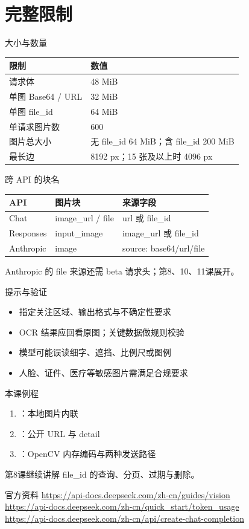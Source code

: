 \documentclass[aspectratio=169,UTF8]{ctexbeamer}
\begin{document}
\section{完整限制}
\begin{frame}{大小与数量}
\small
\begin{tabular}{ll}
\toprule
限制 & 数值\\
\midrule
请求体 & 48 MiB\\
单图 Base64 / URL & 32 MiB\\
单图 file\_id & 64 MiB\\
单请求图片数 & 600\\
图片总大小 & 无 file\_id 64 MiB；含 file\_id 200 MiB\\
最长边 & 8192 px；15 张及以上时 4096 px\\
\bottomrule
\end{tabular}
\end{frame}
\begin{frame}{跨 API 的块名}
\begin{tabular}{lll}
\toprule
API & 图片块 & 来源字段\\
\midrule
Chat & image\_url / file & url 或 file\_id\\
Responses & input\_image & image\_url 或 file\_id\\
Anthropic & image & source: base64/url/file\\
\bottomrule
\end{tabular}
Anthropic 的 file 来源还需 beta 请求头；第8、10、11课展开。
\end{frame}
\begin{frame}{提示与验证}
\begin{itemize}
  \item 指定关注区域、输出格式与不确定性要求
  \item OCR 结果应回看原图；关键数据做规则校验
  \item 模型可能误读细字、遮挡、比例尺或图例
  \item 人脸、证件、医疗等敏感图片需满足合规要求
\end{itemize}
\end{frame}
\begin{frame}{本课例程}
\begin{enumerate}
  \item {}：本地图片内联
  \item {}：公开 URL 与 detail
  \item {}：OpenCV 内存编码与两种发送路径
\end{enumerate}
第8课继续讲解 file\_id 的查询、分页、过期与删除。
\end{frame}
\begin{frame}{官方资料}
\small
\url{https://api-docs.deepseek.com/zh-cn/guides/vision}\\
\url{https://api-docs.deepseek.com/zh-cn/quick_start/token_usage}\\
\url{https://api-docs.deepseek.com/zh-cn/api/create-chat-completion}
\end{frame}
\end{document}
